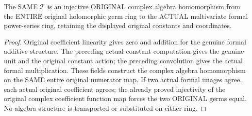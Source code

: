 \begin{theorem}
\label{hir:actual-original-formal-taylor-algebra-embedding}
\leanok
The SAME $\mathcal T$ is an injective ORIGINAL complex algebra homomorphism
from the ENTIRE original holomorphic germ ring to the ACTUAL multivariate
formal power-series ring, retaining the displayed original constants and
coordinates.
\end{theorem}
\begin{proof}
Original coefficient linearity gives zero and addition for the genuine
formal additive structure. The preceding actual constant computation
gives the genuine unit and the original constant action; the preceding
convolution gives the actual formal multiplication. These fields construct
the complex algebra homomorphism on the SAME entire original numerator
map. If two actual formal images agree, each actual original coefficient
agrees; the already proved injectivity of the original complex coefficient
function map forces the two ORIGINAL germs equal. No algebra structure is
transported or substituted on either ring.
\end{proof}

